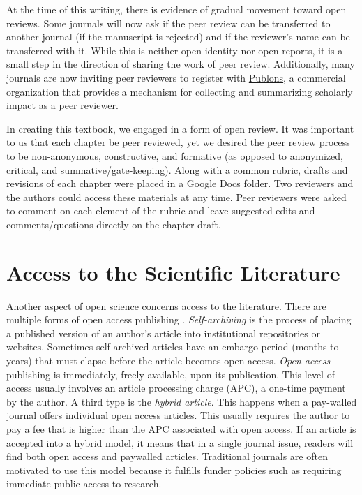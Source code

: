 \documentclass[
  11pt,
]{book}
\begin{document}
At the time of this writing, there is evidence of gradual movement toward open reviews. Some journals will now ask if the peer review can be transferred to another journal (if the manuscript is rejected) and if the reviewer's name can be transferred with it. While this is neither open identity nor open reports, it is a small step in the direction of sharing the work of peer review. Additionally, many journals are now inviting peer reviewers to register with \href{https://publons.com/wos-op/about/home/}{Publons}, a commercial organization that provides a mechanism for collecting and summarizing scholarly impact as a peer reviewer.

In creating this textbook, we engaged in a form of open review. It was important to us that each chapter be peer reviewed, yet we desired the peer review process to be non-anonymous, constructive, and formative (as opposed to anonymized, critical, and summative/gate-keeping). Along with a common rubric, drafts and revisions of each chapter were placed in a Google Docs folder. Two reviewers and the authors could access these materials at any time. Peer reviewers were asked to comment on each element of the rubric and leave suggested edits and comments/questions directly on the chapter draft.

\hypertarget{access-to-the-scientific-literature}{%
\section{Access to the Scientific Literature}\label{access-to-the-scientific-literature}}

Another aspect of open science concerns access to the literature. There are multiple forms of open access publishing \citep{bezjak_open_2018, shah_open_2017}. \emph{Self-archiving} is the process of placing a published version of an author's article into institutional repositories or websites. Sometimes self-archived articles have an embargo period (months to years) that must elapse before the article becomes open access. \emph{Open access} publishing is immediately, freely available, upon its publication. This level of access usually involves an article processing charge (APC), a one-time payment by the author. A third type is the \emph{hybrid article}. This happens when a pay-walled journal offers individual open access articles. This usually requires the author to pay a fee that is higher than the APC associated with open access. If an article is accepted into a hybrid model, it means that in a single journal issue, readers will find both open access and paywalled articles. Traditional journals are often motivated to use this model because it fulfills funder policies such as requiring immediate public access to research.
\end{document}
